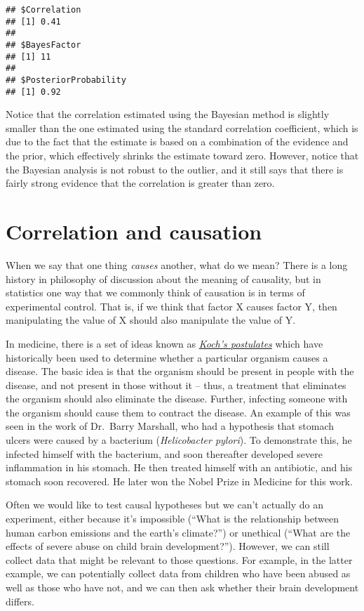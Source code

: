 \documentclass[]{book}
\theoremstyle{definition}
\theoremstyle{definition}
\theoremstyle{definition}
\theoremstyle{remark}
\begin{document}
\begin{verbatim}
## $Correlation
## [1] 0.41
## 
## $BayesFactor
## [1] 11
## 
## $PosteriorProbability
## [1] 0.92
\end{verbatim}

Notice that the correlation estimated using the Bayesian method is
slightly smaller than the one estimated using the standard correlation
coefficient, which is due to the fact that the estimate is based on a
combination of the evidence and the prior, which effectively shrinks the
estimate toward zero. However, notice that the Bayesian analysis is not
robust to the outlier, and it still says that there is fairly strong
evidence that the correlation is greater than zero.

\section{Correlation and causation}\label{correlation-and-causation}

When we say that one thing \emph{causes} another, what do we mean? There
is a long history in philosophy of discussion about the meaning of
causality, but in statistics one way that we commonly think of causation
is in terms of experimental control. That is, if we think that factor X
causes factor Y, then manipulating the value of X should also manipulate
the value of Y.

In medicine, there is a set of ideas known as
\href{https://en.wikipedia.org/wiki/Koch\%27s_postulates}{\emph{Koch's
postulates}} which have historically been used to determine whether a
particular organism causes a disease. The basic idea is that the
organism should be present in people with the disease, and not present
in those without it -- thus, a treatment that eliminates the organism
should also eliminate the disease. Further, infecting someone with the
organism should cause them to contract the disease. An example of this
was seen in the work of Dr.~Barry Marshall, who had a hypothesis that
stomach ulcers were caused by a bacterium (\emph{Helicobacter pylori}).
To demonstrate this, he infected himself with the bacterium, and soon
thereafter developed severe inflammation in his stomach. He then treated
himself with an antibiotic, and his stomach soon recovered. He later won
the Nobel Prize in Medicine for this work.

Often we would like to test causal hypotheses but we can't actually do
an experiment, either because it's impossible (``What is the
relationship between human carbon emissions and the earth's climate?'')
or unethical (``What are the effects of severe abuse on child brain
development?''). However, we can still collect data that might be
relevant to those questions. For example, in the latter example, we can
potentially collect data from children who have been abused as well as
those who have not, and we can then ask whether their brain development
differs.
\end{document}
